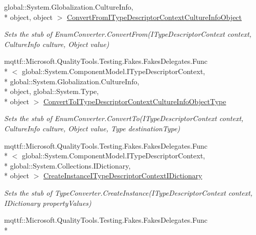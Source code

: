 \begin{DoxyCompactItemize}
global\-::\-System.\-Globalization.\-Culture\-Info, \\*
object, object $>$ \hyperlink{class_system_1_1_component_model_1_1_fakes_1_1_stub_enum_converter_a1d8a8285f8eedf20bddcdae6d14a2933}{Convert\-From\-I\-Type\-Descriptor\-Context\-Culture\-Info\-Object}
\begin{DoxyCompactList}\small\item\em Sets the stub of Enum\-Converter.\-Convert\-From(\-I\-Type\-Descriptor\-Context context, Culture\-Info culture, Object value)\end{DoxyCompactList}\item 
mqttf\-::\-Microsoft.\-Quality\-Tools.\-Testing.\-Fakes.\-Fakes\-Delegates.\-Func\\*
$<$ global\-::\-System.\-Component\-Model.\-I\-Type\-Descriptor\-Context, \\*
global\-::\-System.\-Globalization.\-Culture\-Info, \\*
object, global\-::\-System.\-Type, \\*
object $>$ \hyperlink{class_system_1_1_component_model_1_1_fakes_1_1_stub_enum_converter_a40109870e61b22f88ababdc17bd63daa}{Convert\-To\-I\-Type\-Descriptor\-Context\-Culture\-Info\-Object\-Type}
\begin{DoxyCompactList}\small\item\em Sets the stub of Enum\-Converter.\-Convert\-To(\-I\-Type\-Descriptor\-Context context, Culture\-Info culture, Object value, Type destination\-Type)\end{DoxyCompactList}\item 
mqttf\-::\-Microsoft.\-Quality\-Tools.\-Testing.\-Fakes.\-Fakes\-Delegates.\-Func\\*
$<$ global\-::\-System.\-Component\-Model.\-I\-Type\-Descriptor\-Context, \\*
global\-::\-System.\-Collections.\-I\-Dictionary, \\*
object $>$ \hyperlink{class_system_1_1_component_model_1_1_fakes_1_1_stub_enum_converter_abbba5825c5be78e5c083f24132af7963}{Create\-Instance\-I\-Type\-Descriptor\-Context\-I\-Dictionary}
\begin{DoxyCompactList}\small\item\em Sets the stub of Type\-Converter.\-Create\-Instance(\-I\-Type\-Descriptor\-Context context, I\-Dictionary property\-Values)\end{DoxyCompactList}\item 
mqttf\-::\-Microsoft.\-Quality\-Tools.\-Testing.\-Fakes.\-Fakes\-Delegates.\-Func\\*

\end{DoxyCompactItemize}
